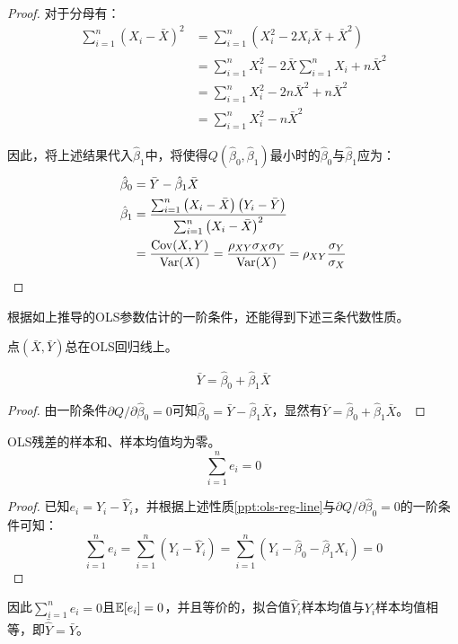 \documentclass[11pt]{article}
\begin{document}
\begin{proof}
对于分母有：
\begin{align*}
    \sum_{i=1}^{n} \left(X_i - \bar{X}\right)^2
    &= \sum_{i=1}^{n} \left( X_i^2 - 2 X_i\bar{X} + \bar{X}^2 \right) \\
    &= \sum_{i=1}^{n} X_i^2 - 2 \bar{X} \sum_{i=1}^{n} X_i + n\bar{X}^2 \\
    &= \sum_{i=1}^{n} X_i^2 - 2 n \bar{X}^2 + n\bar{X}^2 \\
    &= \sum_{i=1}^{n} X_i^2 - n \bar{X}^2 
\end{align*}

因此，将上述结果代入$\hat{\beta}_1$中，将使得$Q(\hat{\beta}_0,\hat{\beta}_1)$最小时的$\hat{\beta}_0$与$\hat{\beta}_1$应为：
\begin{align*}
    \hat{\beta}_0 &= \bar{Y} - \hat{\beta}_1 \bar{X} \\
    \hat{\beta}_1 &= \frac{\sum_{i=1}^{n} \left(X_i - \bar{X}\right) \left(Y_i - \bar{Y}\right)}{\sum_{i=1}^{n} \left(X_i - \bar{X}\right)^2} \\
    &= \frac{\operatorname{Cov}(X,Y)}{\operatorname{Var}(X)} = \frac{\rho_{XY} \sigma_X \sigma_Y}{\operatorname{Var}(X)} = \rho_{XY} \frac{\sigma_Y}{\sigma_X}
\end{align*}
\end{proof}

根据如上推导的OLS参数估计的一阶条件，还能得到下述三条代数性质。

\begin{property}
    点$\left(\bar{X},\bar{Y}\right)$总在OLS回归线上。

    \begin{equation*}
        \bar{Y} = \hat{\beta}_0 + \hat{\beta}_1 \bar{X}
    \end{equation*}

    \begin{proof}
        由一阶条件$\partial Q/\partial \hat{\beta}_0 = 0$可知$\hat{\beta}_0 = \bar{Y} - \hat{\beta}_1 \bar{X}$，显然有$\bar{Y} = \hat{\beta}_0 + \hat{\beta}_1 \bar{X}$。
    \end{proof}
    \label{ppt:ols-reg-line}
\end{property}

\begin{property}
    OLS残差的样本和、样本均值均为零。
    \begin{equation*}
        \sum_{i=1}^{n} e_i = 0
    \end{equation*}

    \begin{proof}
        已知$e_i = Y_i - \hat{Y}_i$，并根据上述性质\ref{ppt:ols-reg-line}与$\partial Q / \partial \hat{\beta}_0 = 0$的一阶条件可知：
        \begin{equation*}
            \sum_{i=1}^{n} e_i 
            = \sum_{i=1}^{n} \left(Y_i - \hat{Y}_i\right)
            = \sum_{i=1}^{n} \left(Y_i - \hat{\beta}_0 - \hat{\beta}_1 X_i \right) = 0
        \end{equation*}
    \end{proof}

    因此$\sum_{i=1}^{n} e_i=0$且$\mathbb{E}[e_i]=0$，并且等价的，拟合值$\hat{Y}_i$样本均值与${Y_i}$样本均值相等，即$\bar{\hat{Y}}=\bar{Y}$。
    \label{ppt:ols-error-mean}
\end{property}
\end{document}
